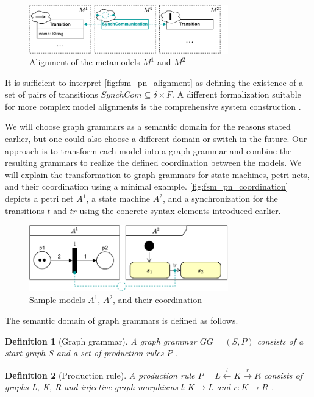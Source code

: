 \documentclass[conference]{IEEEtran}
\newtheorem{definition}{Definition}
\begin{document}
\begin{figure}[h]
    \centering
    \includegraphics[width=3.4in]{fsm_pn_alignment}
    \caption{Alignment of the metamodels $M^1$ and $M^2$}
    \label{fig:fsm_pn_alignment}
\end{figure}

It is sufficient to interpret \autoref{fig:fsm_pn_alignment} as defining the existence of a set of pairs of transitions $SynchCom \subseteq \delta \times F$.
A different formalization suitable for more complex model alignments is the comprehensive system construction \cite{stunkelMultipleModelSynchronization2020}.

We will choose graph grammars as a semantic domain for the reasons stated earlier, but one could also choose a different domain or switch in the future.
Our approach is to transform each model into a graph grammar and combine the resulting grammars to realize the defined coordination between the models.
We will explain the transformation to graph grammars for state machines, petri nets, and their coordination using a minimal example.
\autoref{fig:fsm_pn_coordination} depicts a petri net $A^1$, a state machine $A^2$, and a synchronization for the transitions $t$ and $tr$ using the concrete syntax elements introduced earlier.

\begin{figure}[h]
    \centering
    \includegraphics[width=3.4in]{fsm_pn_sample}
    \caption{Sample models $A^1$, $A^2$, and their coordination}
    \label{fig:fsm_pn_coordination}
\end{figure}
The semantic domain of graph grammars is defined as follows.
\begin{definition}[Graph grammar] \label{def:graphGrammar}
A graph grammar $GG=(S, P)$ consists of a start graph $S$ and a set of production rules $P$ \cite{ehrigGraphGrammarsPetri2004}. 
\end{definition}
\begin{definition}[Production rule] \label{def:productionRule}
A production rule $P= L \overset{l}{\leftarrow} K \overset{r}{\to} R$ consists of graphs L, K, R and injective graph morphisms $l: K \to L$ and $r: K \to R$ \cite{ehrigGraphGrammarsPetri2004}. 
\end{definition}
\end{document}
